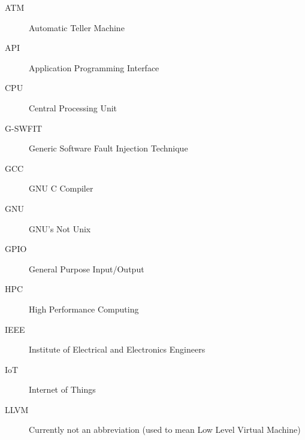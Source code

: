 \begin{description}
\item[ATM] Automatic Teller Machine
\item[API] Application Programming Interface
\item[CPU] Central Processing Unit
\item[G-SWFIT] Generic Software Fault Injection Technique
\item[GCC] GNU C Compiler
\item[GNU] GNU's Not Unix 
\item[GPIO] General Purpose Input/Output
\item[HPC] High Performance Computing
\item[IEEE] Institute of Electrical and Electronics Engineers
\item[IoT] Internet of Things
\item[LLVM] Currently not an abbreviation (used to mean  Low Level Virtual Machine)
\end{description}